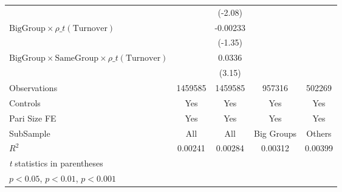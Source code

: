 {\begin{tabular}{l*{4}{c}}
                &                  &  (-2.08)         &                  &                  \\
[1em]
$ {\text{BigGroup} } \times  {\rho\_t(\text{Turnover})}  $ &                  & -0.00233         &                  &                  \\
                &                  &  (-1.35)         &                  &                  \\
[1em]
$ {\text{BigGroup}}\times{\text{SameGroup}}\times  {\rho\_t(\text{Turnover})}$ &                  &   0.0336\sym{**} &                  &                  \\
                &                  &   (3.15)         &                  &                  \\
\hline
Observations    &  1459585         &  1459585         &   957316         &   502269         \\
Controls        &      Yes         &      Yes         &      Yes         &      Yes         \\
Pari Size FE    &      Yes         &      Yes         &      Yes         &      Yes         \\
SubSample       &      All         &      All         &Big Groups         &   Others         \\
$ R^2$          &  0.00241         &  0.00284         &  0.00312         &  0.00399         \\
\hline\hline
\multicolumn{5}{l}{\footnotesize \textit{t} statistics in parentheses}\\
\multicolumn{5}{l}{\footnotesize \sym{*} \(p<0.05\), \sym{**} \(p<0.01\), \sym{***} \(p<0.001\)}\\
\end{tabular}
}
